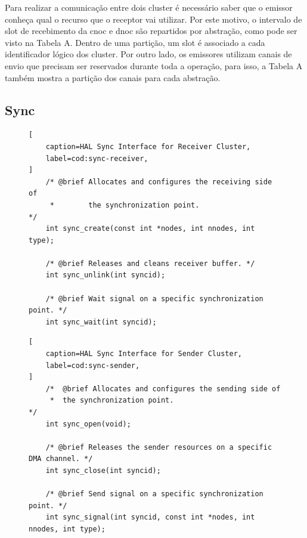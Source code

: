     Para realizar a comunicação entre dois cluster é necessário saber
    que o emissor conheça qual o recurso que o receptor vai utilizar.
    Por este motivo, o intervalo de slot de recebimento da cnoc e dnoc
    são repartidos por abstração, como pode ser visto na Tabela A.
    Dentro de uma partição, um slot é associado a cada identificador lógico dos cluster.
    Por outro lado, os emissores utilizam canais de envio que precisam
    ser reservados durante toda a operação, para isso, a Tabela A também mostra
    a partição dos canais para cada abstração.

\subsection{Sync}


\begin{figure}[t]
\begin{lstlisting}[
    caption=HAL Sync Interface for Receiver Cluster,
    label=cod:sync-receiver,
]
    /* @brief Allocates and configures the receiving side of
     *        the synchronization point.                     */
    int sync_create(const int *nodes, int nnodes, int type);

    /* @brief Releases and cleans receiver buffer. */
    int sync_unlink(int syncid);

    /* @brief Wait signal on a specific synchronization point. */
    int sync_wait(int syncid);
\end{lstlisting}
\end{figure}

\begin{figure}[t]
\begin{lstlisting}[
    caption=HAL Sync Interface for Sender Cluster,
    label=cod:sync-sender,
]
    /*  @brief Allocates and configures the sending side of
     *  the synchronization point.                          */
    int sync_open(void);

    /* @brief Releases the sender resources on a specific DMA channel. */
    int sync_close(int syncid);

    /* @brief Send signal on a specific synchronization point. */
    int sync_signal(int syncid, const int *nodes, int nnodes, int type);
\end{lstlisting}
\end{figure}

